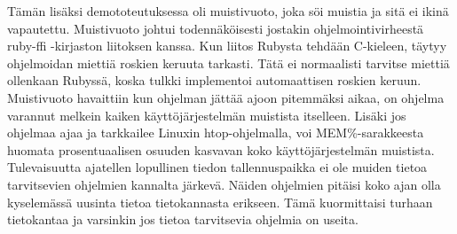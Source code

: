 Tämän lisäksi demototeutuksessa oli muistivuoto, joka söi muistia ja sitä ei ikinä vapautettu. Muistivuoto johtui todennäköisesti jostakin ohjelmointivirheestä ruby-ffi -kirjaston liitoksen kanssa. Kun liitos Rubysta tehdään C-kieleen, täytyy ohjelmoidan miettiä roskien keruuta tarkasti. Tätä ei normaalisti tarvitse miettiä ollenkaan Rubyssä, koska tulkki implementoi automaattisen roskien keruun. Muistivuoto havaittiin kun ohjelman jättää ajoon pitemmäksi aikaa, on ohjelma varannut melkein kaiken käyttöjärjestelmän muistista itselleen. Lisäki jos ohjelmaa ajaa ja tarkkailee Linuxin htop-ohjelmalla, voi MEM\%-sarakkeesta huomata prosentuaalisen osuuden kasvavan koko käyttöjärjestelmän muistista. Tulevaisuutta ajatellen lopullinen tiedon tallennuspaikka ei ole muiden tietoa tarvitsevien ohjelmien kannalta järkevä. Näiden ohjelmien pitäisi koko ajan olla kyselemässä uusinta tietoa tietokannasta erikseen. Tämä kuormittaisi turhaan tietokantaa ja varsinkin jos tietoa tarvitsevia ohjelmia on useita.
